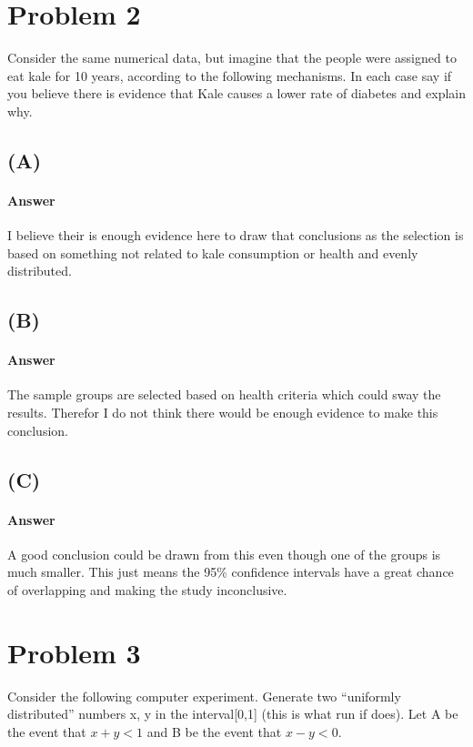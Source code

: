 \documentclass[12pt]{article}
\begin{document}
\section*{Problem 2}
Consider the same numerical data, but imagine that the people were assigned to eat kale for 10 years, according to the following mechanisms.  In each case say if you believe there is evidence that Kale causes a lower rate of diabetes and explain why.

\subsection*{(A)}

\paragraph{Answer}
I believe their is enough evidence here to draw that conclusions as the selection is based on something not related to kale consumption or health and evenly distributed. 

\subsection*{(B)}

\paragraph{Answer}
The sample groups are selected based on health criteria which could sway the results. Therefor I do not think there would be enough evidence to make this conclusion.

\subsection*{(C)}

\paragraph{Answer}
A good conclusion could be drawn from this even though one of the groups is much smaller. This just means the 95\% confidence intervals have a great chance of overlapping and making the study inconclusive.

\section*{Problem 3}
 Consider the following computer experiment.  Generate two “uniformly distributed” numbers x, y in the interval[0,1] (this is what run if does). Let A be the event that $x+y < 1$ and B be the event that $x-y < 0$.
\end{document}
